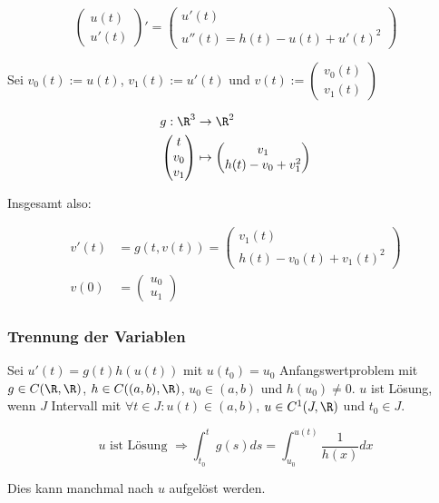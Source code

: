 \[ \begin{pmatrix}u(t)\\u'(t)\end{pmatrix}' = \begin{pmatrix}u'(t)\\u''(t)=h(t)-u(t)+u'(t)^2\end{pmatrix} \]

Sei $v_0(t):=u(t)$, $v_1(t):=u'(t)$ und $v(t):=\begin{pmatrix}v_0(t)\\v_1(t)\end{pmatrix}$

\vspace*{-4mm}
\begin{align*}
	g : \R^3 &\rightarrow \R^2 \\
	\begin{pmatrix}t\\v_0\\v_1\end{pmatrix} &\mapsto \begin{pmatrix}v_1\\h(t)-v_0+v_1^2\end{pmatrix}
\end{align*}

Insgesamt also:

\vspace*{-4mm}
\begin{align*}
	v'(t)&=g(t,v(t))=\begin{pmatrix}v_1(t)\\h(t)-v_0(t)+v_1(t)^2\end{pmatrix}\\
	v(0)&=\begin{pmatrix}u_0\\u_1\end{pmatrix}
\end{align*}

\subsubsection*{Trennung der Variablen}

Sei $u'(t)=g(t)h(u(t))$ mit $u(t_0)=u_0$ Anfangswertproblem mit $g \in C(\R, \R)$, $h \in C((a, b), \R)$, $u_0 \in (a, b)$ und $h(u_0) \neq 0$. $u$ ist Lösung, wenn $J$ Intervall mit $\forall t \in J : u(t) \in (a, b)$, $u \in C^1(J, \R)$ und $t_0 \in J$.

\vspace*{-5mm}
\[ u \text{ ist Lösung } \Rightarrow \int_{t_0}^t g(s) ds = \int_{u_0}^{u(t)} \frac{1}{h(x)} dx \]
\vspace*{-3mm}

Dies kann manchmal nach $u$ aufgelöst werden.
